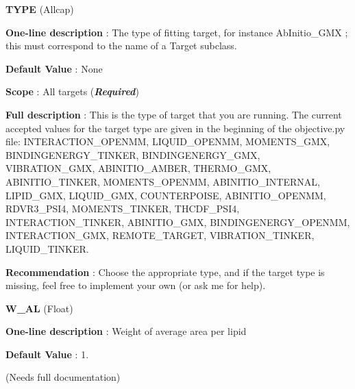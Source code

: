 \begin{DoxyItemize}
\item {\bfseries  T\-Y\-P\-E } (Allcap) \par
{\bfseries  One-\/line description }\-: The type of fitting target, for instance Ab\-Initio\-\_\-\-G\-M\-X ; this must correspond to the name of a Target subclass. \par
{\bfseries  Default Value }\-: None \par
{\bfseries  Scope }\-: All targets ({\bfseries {\itshape Required}}) \par
{\bfseries  Full description }\-: This is the type of target that you are running. The current accepted values for the target type are given in the beginning of the objective.\-py file\-: I\-N\-T\-E\-R\-A\-C\-T\-I\-O\-N\-\_\-\-O\-P\-E\-N\-M\-M, L\-I\-Q\-U\-I\-D\-\_\-\-O\-P\-E\-N\-M\-M, M\-O\-M\-E\-N\-T\-S\-\_\-\-G\-M\-X, B\-I\-N\-D\-I\-N\-G\-E\-N\-E\-R\-G\-Y\-\_\-\-T\-I\-N\-K\-E\-R, B\-I\-N\-D\-I\-N\-G\-E\-N\-E\-R\-G\-Y\-\_\-\-G\-M\-X, V\-I\-B\-R\-A\-T\-I\-O\-N\-\_\-\-G\-M\-X, A\-B\-I\-N\-I\-T\-I\-O\-\_\-\-A\-M\-B\-E\-R, T\-H\-E\-R\-M\-O\-\_\-\-G\-M\-X, A\-B\-I\-N\-I\-T\-I\-O\-\_\-\-T\-I\-N\-K\-E\-R, M\-O\-M\-E\-N\-T\-S\-\_\-\-O\-P\-E\-N\-M\-M, A\-B\-I\-N\-I\-T\-I\-O\-\_\-\-I\-N\-T\-E\-R\-N\-A\-L, L\-I\-P\-I\-D\-\_\-\-G\-M\-X, L\-I\-Q\-U\-I\-D\-\_\-\-G\-M\-X, C\-O\-U\-N\-T\-E\-R\-P\-O\-I\-S\-E, A\-B\-I\-N\-I\-T\-I\-O\-\_\-\-O\-P\-E\-N\-M\-M, R\-D\-V\-R3\-\_\-\-P\-S\-I4, M\-O\-M\-E\-N\-T\-S\-\_\-\-T\-I\-N\-K\-E\-R, T\-H\-C\-D\-F\-\_\-\-P\-S\-I4, I\-N\-T\-E\-R\-A\-C\-T\-I\-O\-N\-\_\-\-T\-I\-N\-K\-E\-R, A\-B\-I\-N\-I\-T\-I\-O\-\_\-\-G\-M\-X, B\-I\-N\-D\-I\-N\-G\-E\-N\-E\-R\-G\-Y\-\_\-\-O\-P\-E\-N\-M\-M, I\-N\-T\-E\-R\-A\-C\-T\-I\-O\-N\-\_\-\-G\-M\-X, R\-E\-M\-O\-T\-E\-\_\-\-T\-A\-R\-G\-E\-T, V\-I\-B\-R\-A\-T\-I\-O\-N\-\_\-\-T\-I\-N\-K\-E\-R, L\-I\-Q\-U\-I\-D\-\_\-\-T\-I\-N\-K\-E\-R. \par
{\bfseries  Recommendation }\-: Choose the appropriate type, and if the target type is missing, feel free to implement your own (or ask me for help).\end{DoxyItemize}
\begin{DoxyItemize}
\item {\bfseries  W\-\_\-\-A\-L } (Float) \par
{\bfseries  One-\/line description }\-: Weight of average area per lipid \par
{\bfseries  Default Value }\-: 1. \par
(Needs full documentation)\end{DoxyItemize}
